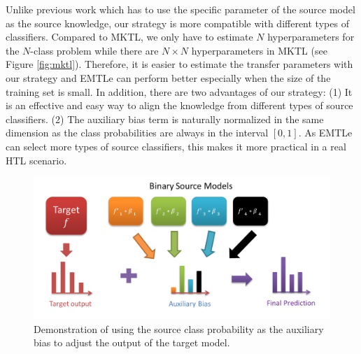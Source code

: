Unlike previous work\cite{aytar2011tabula,tommasi2014learning,yang2007adapting} which has to use the specific parameter of the source model as the source knowledge, our strategy is more compatible with different types of classifiers. Compared to MKTL\cite{jie2011multiclass}, we only have to estimate $N$ hyperparameters for the $N$-class problem while there are \mbox{$N\times N$} hyperparameters in MKTL (see Figure \ref{fig:mktl}). Therefore, it is easier to estimate the transfer parameters with our strategy and EMTLe can perform better especially when the size of the training set is small.
In addition, there are two advantages of our strategy: (1) It is an effective and easy way to align the knowledge from different types of source classifiers.
(2) The auxiliary bias term is naturally normalized in the same dimension as the class probabilities are always in the interval $[0,1]$.  As EMTLe can select more types of source classifiers, this makes it more practical in a real HTL scenario.

\begin{figure}
	\centering
	\includegraphics[scale=0.40]{fig/ab.png}
	\caption{Demonstration of using the source class probability as the auxiliary bias to adjust the output of the target model.}%
	\label{fig:ab}
\end{figure}


